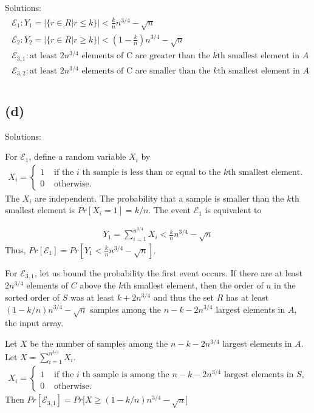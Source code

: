 \documentclass[11pt]{537homework}
\begin{document}
Solutions: 
\begin{align}
\begin{array}{l}
  {\mathcal{E}_{1}: Y_{1}=|\{r \in R | r \leq k\}|<\frac{k}{n} n^{3 / 4}-\sqrt{n}} \\
  {\mathcal{E}_{2}: Y_{2}=|\{r \in R | r \geq k\}|<(1 - \frac{k}{n}) n^{3 / 4}-\sqrt{n}}  \\
  {\mathcal{E}_{3,1}: \text{at least } 2n^{3/4} \text{ elements of C are greater than the $k$th smallest element in $A$}}\\
  {\mathcal{E}_{3,2}:\text{at least } 2n^{3/4} \text{ elements of C are smaller than the $k$th smallest element in $A$}}\\
\end{array}
\end{align}


\subsection*{(d)}

Solutions: 

For ${\mathcal{E}_1}$, define a random variable $X_i$ by
\begin{align}
  X_{i}=\left\{\begin{array}{ll}
{1} & {\text { if the } i \text { th sample is less than or equal to the $k$th smallest element. }} \\
{0} & {\text { otherwise. }}
\end{array}\right.
\end{align}
The $X_i$ are independent. The probability that a sample is smaller than the $k$th smallest element is $Pr[X_i = 1] = k/n$. The event ${\mathcal{E}_1}$ is equivalent to 

\begin{align}
  Y_{1}=\sum_{i=1}^{n^{3 / 4}} X_{i}<\frac{k}{n} n^{3 / 4}-\sqrt{n}
\end{align}
Thus, $Pr[{\mathcal{E}_1}] = Pr[Y_1 < \frac{k}{n} n^{3 / 4}-\sqrt{n}]$.


For ${\mathcal{E}_{3,1}}$, let us bound the probability the first event occurs. If there are at least $2n^{3/4}$ elements of $C$ above the $k$th smallest element, then the order of $u$ in the sorted order of $S$ was at least $k+2n^{3/4}$ and thus the set $R$ has at least $(1 - k/n)n^{3/4}-\sqrt{n}$ samples among the $n-k-2n^{3/4}$ largest elements in $A$, the input array.

Let $X$ be the number of samples among the $n-k-2n^{3/4}$ largest elements in $A$. Let $X = \sum_{i=1}^{n^{3/4}}X_i$. 
\begin{align}
  X_{i}=\left\{\begin{array}{ll}
{1} & {\text { if the } i \text { th sample is among the } n-k-2n^{3/4} \text { largest elements in } S,} \\
{0} & {\text { otherwise. }}
\end{array}\right.
\end{align}
Then $Pr[{\mathcal{E}_{3,1}}] = Pr\big[X\geq (1 - k/n)n^{3/4}-\sqrt{n}\big]$
\end{document}
